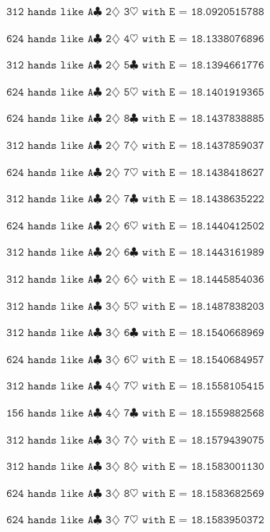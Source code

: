 \documentclass[letter,12pt]{article}
\begin{document}
{$\texttt{312 hands like A$\clubsuit$ 2$\diamondsuit$ 3$\heartsuit$ with E = 18.0920515788}$

$\texttt{624 hands like A$\clubsuit$ 2$\diamondsuit$ 4$\heartsuit$ with E = 18.1338076896}$

$\texttt{312 hands like A$\clubsuit$ 2$\diamondsuit$ 5$\clubsuit$ with E = 18.1394661776}$

$\texttt{624 hands like A$\clubsuit$ 2$\diamondsuit$ 5$\heartsuit$ with E = 18.1401919365}$

$\texttt{624 hands like A$\clubsuit$ 2$\diamondsuit$ 8$\clubsuit$ with E = 18.1437838885}$

$\texttt{312 hands like A$\clubsuit$ 2$\diamondsuit$ 7$\diamondsuit$ with E = 18.1437859037}$

$\texttt{624 hands like A$\clubsuit$ 2$\diamondsuit$ 7$\heartsuit$ with E = 18.1438418627}$

$\texttt{312 hands like A$\clubsuit$ 2$\diamondsuit$ 7$\clubsuit$ with E = 18.1438635222}$

$\texttt{624 hands like A$\clubsuit$ 2$\diamondsuit$ 6$\heartsuit$ with E = 18.1440412502}$

$\texttt{312 hands like A$\clubsuit$ 2$\diamondsuit$ 6$\clubsuit$ with E = 18.1443161989}$

$\texttt{312 hands like A$\clubsuit$ 2$\diamondsuit$ 6$\diamondsuit$ with E = 18.1445854036}$

$\texttt{312 hands like A$\clubsuit$ 3$\diamondsuit$ 5$\heartsuit$ with E = 18.1487838203}$

$\texttt{312 hands like A$\clubsuit$ 3$\diamondsuit$ 6$\clubsuit$ with E = 18.1540668969}$

$\texttt{624 hands like A$\clubsuit$ 3$\diamondsuit$ 6$\heartsuit$ with E = 18.1540684957}$

$\texttt{312 hands like A$\clubsuit$ 4$\diamondsuit$ 7$\heartsuit$ with E = 18.1558105415}$

$\texttt{156 hands like A$\clubsuit$ 4$\diamondsuit$ 7$\clubsuit$ with E = 18.1559882568}$

$\texttt{312 hands like A$\clubsuit$ 3$\diamondsuit$ 7$\diamondsuit$ with E = 18.1579439075}$

$\texttt{312 hands like A$\clubsuit$ 3$\diamondsuit$ 8$\diamondsuit$ with E = 18.1583001130}$

$\texttt{624 hands like A$\clubsuit$ 3$\diamondsuit$ 8$\heartsuit$ with E = 18.1583682569}$

$\texttt{624 hands like A$\clubsuit$ 3$\diamondsuit$ 7$\heartsuit$ with E = 18.1583950372}$

}
\end{document}
